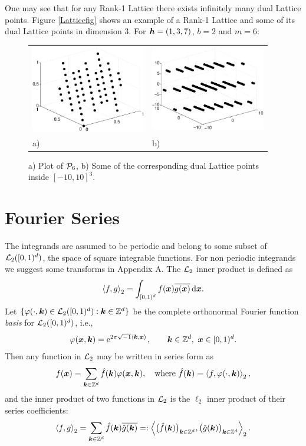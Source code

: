 \documentclass[graybox]{svmult}
\newcommand{\Z}{\mathbb{Z}} %
\newcommand{\bsx}{\boldsymbol{x}}    %
\begin{document}
One may see that for any Rank-1 Lattice there exists infinitely many dual Lattice points. Figure \eqref{Latticefig} shows an example of a Rank-1 Lattice and some of its dual Lattice points in dimension 3. For $\boldsymbol{h}=(1,3,7)$, $b=2$ and $m=6$:
\begin{figure}[h!]
\centering
\begin{tabular}{>{\centering}p{5cm}>{\centering}p{5cm}}
\includegraphics[width=5cm]{Images/Lattice64.eps} &
\includegraphics[width=5cm]{Images/DualLattice64.eps}\tabularnewline
a) & b)
\end{tabular}
\caption{a) Plot of $\mathcal{P}_6$, b) Some of the corresponding dual Lattice points inside $[-10,10]^3$.}\label{Latticefig}
\end{figure}

\section{Fourier Series}\label{secfourierseries}

The integrands are assumed to be periodic and belong to some subset of $\mathcal{L}_2([0,1)^d)$, the space of square integrable functions. For non periodic integrands we suggest some transforms in Appendix A. The $\mathcal{L}_2$ inner product is defined as
\[
\ip[2]{f}{g} = \int_{\cube} f(\bsx) \overline{g(\bsx)} \, \dif \bsx.
\]
Let $\{\varphi(\cdot,\bsk) \in \cl_2(\cube) : \bsk \in \Z^d\}$ be the complete orthonormal Fourier function \emph{basis} for $\mathcal{L}_2([0,1)^d)$, i.e.,
\[
\varphi(\bsx,\bsk)  = \E^{2 \pi \sqrt{-1} \ip{\bsk}{\bsx}}, \qquad \bsk \in \Z^d, \ \bsx \in \cube.
\]
Then any function in $\mathcal{L}_2$ may be written in series form as
\begin{equation} \label{Fourierdef}
f(\bsx) = \sum_{\bsk \in \Z^d} \hf(\bsk) \varphi(\bsx,\bsk), \quad \text{where } \hf(\bsk) = \ip[2]{f}{\varphi(\cdot,\bsk)},
\end{equation}
and the inner product of two functions in $\mathcal{L}_2$ is the $\ell_2$ inner product of their series coefficients:
\[
\ip[2]{f}{g} = \sum_{\bsk \in \Z^d} \hf(\bsk)\overline{\hg(\bsk)} =: \ip[2]{\bigl(\hf(\bsk)\bigr)_{\bsk \in \Z^d}}{\bigl ( \hg(\bsk)\bigr )_{\bsk \in \Z^d}}.
\]
\end{document}
